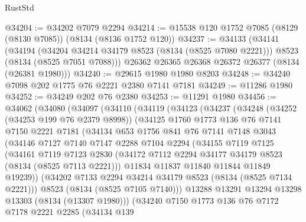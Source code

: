 \begin{lexlean}{RustStd}
\begin{coremodule}
{\begin{coremodule}
{{{{{{{{{{{{{{{{{{{{{{{{{{{{{{{{{{{{{{{{{{{{{{{{{{{{{@34204 := @34202 @7079 @2294
@34214 := @15538 @120 @1752 @7085 (@8129 (@8130 @7085)) (@8134 (@8136 @1752 @120))
@34237 := @34133
    (@34141
      (@34194
        (@34204 @34214 @34179 @8523 (@8134 (@8525 @7080 @2221)))
        @8523
        (@8134 (@8525 @7051 @7088)))
      @26362
      @26365
      @26368
      @26372
      @26377
      (@8134 (@26381 @1980)))
@34240 := @29615 @1980 @1980 @8203
@34248 := @34240 @7098 @202 @1775 @76 @2221 @2380 @7141 @7181
@34249 := @11286 @1980
@34252 := @34249 @202 @76 @2380
@34253 := @11291 @1980
@34456 := @34062
    (@34080
      (@34097
        (@34110
          (@34119
            (@34123
              (@34237
                (@34248
                  (@34252 (@34253 @199 @76 @2379 @8998))
                  (@34125
                    @1760
                    @1773
                    @136
                    @76
                    @7141
                    @7150
                    @2221
                    @7181
                    (@34134
                      @653
                      @1756
                      @841
                      @76
                      @7141
                      @7148
                      @3043
                      (@34146
                        @7127
                        @7140
                        @7147
                        @2288
                        @7104
                        @2294
                        (@34155
                          @7119
                          @7125
                          (@34161
                            @7119
                            @7123
                            @2830
                            (@34172 @7112 @2294 @34177 @34179 @8523 (@8134 (@8525 @7113 @2221)))
                            @11834
                            @11837
                            @11840
                            @11844
                            @11849
                            @19239))
                        (@34202 @7133 @2294 @34214 @34179 @8523 (@8134 (@8525 @7134 @2221)))
                        @8523
                        (@8134 (@8525 @7105 @7140)))
                      @13288
                      @13291
                      @13294
                      @13298
                      @13303
                      (@8134 (@13307 @1980)))
                    (@34240
                      @7150
                      @1773
                      @136
                      @76
                      @7172
                      @7178
                      @2221
                      @2285
                      (@34134
                        @139
}}}}}}}}}}}}}}}}}}}}}}}}}}}}}}}}}}}}}}}}}}}}}}}}}}}}}
\end{coremodule}}
\end{coremodule}
\end{lexlean}
